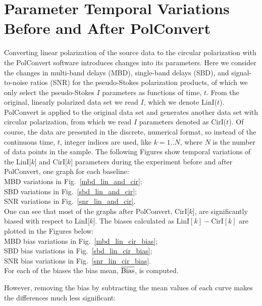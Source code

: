 \documentclass[letterpaper,twoside,12pt]{article}
\begin{document}
\section{Parameter Temporal Variations Before and After PolConvert}

Converting linear polarization of the source data to the circular polarization with the PolConvert software introduces changes into its parameters. Here we consider the changes in multi-band delays (MBD), single-band delays (SBD), and signal-to-noise ratios (SNR) for the pseudo-Stokes polarization products, of which we only select the pseudo-Stokes $I$ parameters as functions of time, $t$. From the original, linearly polarized data set we read $I$, which we denote LinI($t$). PolConvert is applied to the original data set and generates another data set with circular polarization, from which we read $I$ parameters denoted as CirI($t$). Of course, the data are presented in the discrete, numerical format, so instead of the continuous time, $t$, integer indices are used, like $k=\overline{1..N}$, where $N$ is the number of data points in the sample.  The following Figures show temporal variations of the LinI[$k$] and CirI[$k$] parameters during the experiment before and after PolConvert, one graph for each baseline:  \\


\indent MBD variations in Fig.~\ref{mbd_lin_and_cir};  \\
\indent SBD variations in Fig.~\ref{sbd_lin_and_cir};  \\
\indent SNR variations in Fig.~\ref{snr_lin_and_cir}.  \\


One can see that most of the graphs after PolConvert, CirI[$k$], are significantly biased with respect to LinI[$k$]. The biases calculated as $\mathrm{LinI}[k] - \mathrm{CirI}[k]$ are plotted in the Figures below: \\

\indent MBD bias variations in Fig.~\ref{mbd_lin_cir_bias};  \\
\indent SBD bias variations in Fig.~\ref{sbd_lin_cir_bias};  \\
\indent SNR bias variations in Fig.~\ref{snr_lin_cir_bias}.  \\

For each of the biases the bias mean, $\overline{\rm Bias}$, is computed.

However, removing the bias by subtracting the mean values of each curve makes the differences much less significant:
\end{document}
